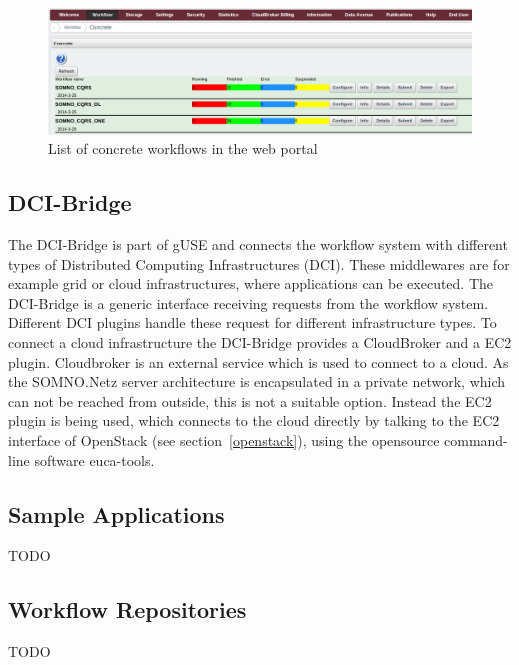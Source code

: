 \begin{figure}%
                \centering
                \includegraphics[width=2.0\columnwidth]{images/interface-workflows.png}
                \caption{List of concrete workflows in the web portal}
                \label{fig:interfaceworkflows}
\end{figure}


\subsection{DCI-Bridge}\label{dci}

The DCI-Bridge is part of gUSE and connects the workflow system with different types of Distributed Computing Infrastructures (DCI).
These middlewares are for example grid or cloud infrastructures, where applications can be executed.
The DCI-Bridge is a generic interface receiving requests from the workflow system.
Different DCI plugins handle these request for different infrastructure types.
To connect a cloud infrastructure the DCI-Bridge provides a CloudBroker and a EC2 plugin.
Cloudbroker is an external service which is used to connect to a cloud.
As the SOMNO.Netz server architecture is encapsulated in a private network, which can not be reached from outside, this is not a suitable option.
Instead the EC2 plugin is being used, which connects to the cloud directly by talking to the EC2 interface of OpenStack (see section~\ref{openstack}), using the opensource command-line software euca-tools.

\subsection{Sample Applications}\label{applications}

TODO

\subsection{Workflow Repositories}\label{repositories}

TODO